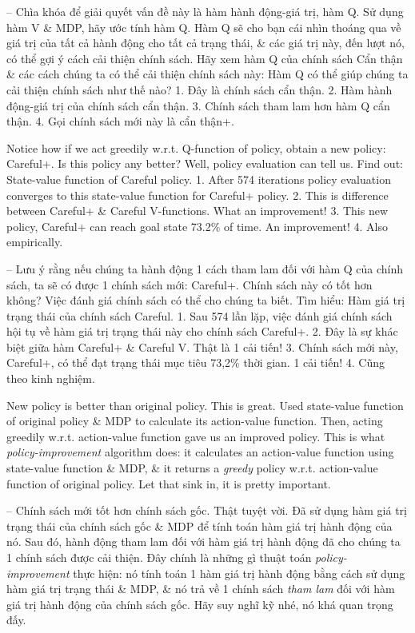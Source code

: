 \documentclass{article}
\begin{document}
\begin{itemize}
\begin{itemize}
\begin{itemize}
            -- Chìa khóa để giải quyết vấn đề này là hàm hành động-giá trị, hàm Q. Sử dụng hàm V \& MDP, hãy ước tính hàm Q. Hàm Q sẽ cho bạn cái nhìn thoáng qua về giá trị của tất cả hành động cho tất cả trạng thái, \& các giá trị này, đến lượt nó, có thể gợi ý cách cải thiện chính sách. Hãy xem hàm Q của chính sách Cẩn thận \& các cách chúng ta có thể cải thiện chính sách này: {\sf Hàm Q có thể giúp chúng ta cải thiện chính sách như thế nào?} 1. Đây là chính sách cẩn thận. 2. Hàm hành động-giá trị của chính sách cẩn thận. 3. Chính sách tham lam hơn hàm Q cẩn thận. 4. Gọi chính sách mới này là cẩn thận+.

            Notice how if we act greedily w.r.t. Q-function of policy, obtain a new policy: Careful+. Is this policy any better? Well, policy evaluation can tell us. Find out: {\sf State-value function of Careful policy.} 1. After 574 iterations policy evaluation converges to this state-value function for Careful+ policy. 2. This is difference between Careful+ \& Careful V-functions. What an improvement! 3. This new policy, Careful+ can reach goal state 73.2\% of time. An improvement! 4. Also empirically.

            -- Lưu ý rằng nếu chúng ta hành động 1 cách tham lam đối với hàm Q của chính sách, ta sẽ có được 1 chính sách mới: Careful+. Chính sách này có tốt hơn không? Việc đánh giá chính sách có thể cho chúng ta biết. Tìm hiểu: {\sf Hàm giá trị trạng thái của chính sách Careful.} 1. Sau 574 lần lặp, việc đánh giá chính sách hội tụ về hàm giá trị trạng thái này cho chính sách Careful+. 2. Đây là sự khác biệt giữa hàm Careful+ \& Careful V. Thật là 1 cải tiến! 3. Chính sách mới này, Careful+, có thể đạt trạng thái mục tiêu 73,2\% thời gian. 1 cải tiến! 4. Cũng theo kinh nghiệm.

            New policy is better than original policy. This is great. Used state-value function of original policy \& MDP to calculate its action-value function. Then, acting greedily w.r.t. action-value function gave us an improved policy. This is what {\it policy-improvement} algorithm does: it calculates an action-value function using state-value function \& MDP, \& it returns a {\it greedy} policy w.r.t. action-value function of original policy. Let that sink in, it is pretty important.

            -- Chính sách mới tốt hơn chính sách gốc. Thật tuyệt vời. Đã sử dụng hàm giá trị trạng thái của chính sách gốc \& MDP để tính toán hàm giá trị hành động của nó. Sau đó, hành động tham lam đối với hàm giá trị hành động đã cho chúng ta 1 chính sách được cải thiện. Đây chính là những gì thuật toán {\it policy-improvement} thực hiện: nó tính toán 1 hàm giá trị hành động bằng cách sử dụng hàm giá trị trạng thái \& MDP, \& nó trả về 1 chính sách {\it tham lam} đối với hàm giá trị hành động của chính sách gốc. Hãy suy nghĩ kỹ nhé, nó khá quan trọng đấy.


\end{itemize}
\end{itemize}
\end{itemize}
\end{document}
